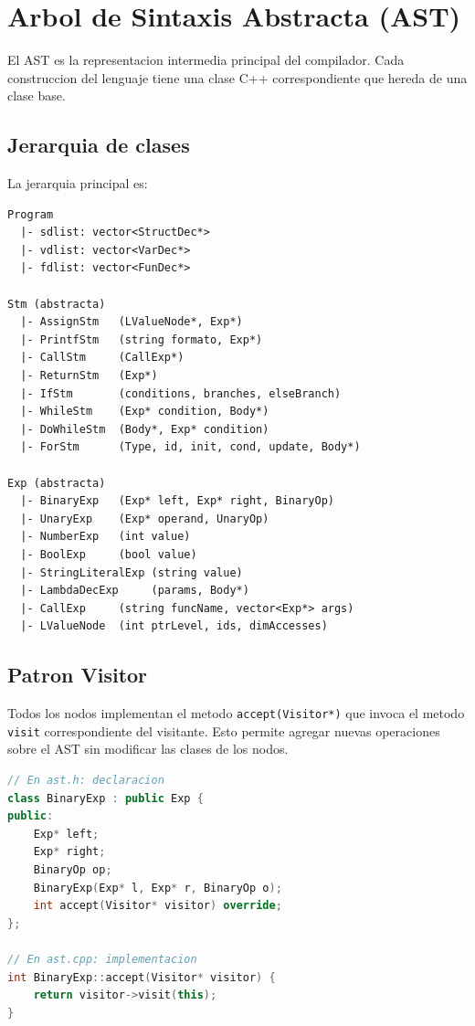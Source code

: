 \documentclass[12pt, a4paper]{article}
\begin{document}
\newpage

\section{Arbol de Sintaxis Abstracta (AST)}

El AST es la representacion intermedia principal del compilador. Cada construccion del lenguaje tiene una clase C++ correspondiente que hereda de una clase base.

\subsection{Jerarquia de clases}

La jerarquia principal es:

\begin{lstlisting}[style=grammarstyle, caption={Jerarquia del AST}]
Program
  |- sdlist: vector<StructDec*>
  |- vdlist: vector<VarDec*>
  |- fdlist: vector<FunDec*>

Stm (abstracta)
  |- AssignStm   (LValueNode*, Exp*)
  |- PrintfStm   (string formato, Exp*)
  |- CallStm     (CallExp*)
  |- ReturnStm   (Exp*)
  |- IfStm       (conditions, branches, elseBranch)
  |- WhileStm    (Exp* condition, Body*)
  |- DoWhileStm  (Body*, Exp* condition)
  |- ForStm      (Type, id, init, cond, update, Body*)

Exp (abstracta)
  |- BinaryExp   (Exp* left, Exp* right, BinaryOp)
  |- UnaryExp    (Exp* operand, UnaryOp)
  |- NumberExp   (int value)
  |- BoolExp     (bool value)
  |- StringLiteralExp (string value)
  |- LambdaDecExp     (params, Body*)
  |- CallExp     (string funcName, vector<Exp*> args)
  |- LValueNode  (int ptrLevel, ids, dimAccesses)
\end{lstlisting}

\subsection{Patron Visitor}

Todos los nodos implementan el metodo \texttt{accept(Visitor*)} que invoca el metodo \texttt{visit} correspondiente del visitante. Esto permite agregar nuevas operaciones sobre el AST sin modificar las clases de los nodos.

\begin{lstlisting}[language=C++, style=cppstyle, caption={Implementacion del patron Visitor en BinaryExp}]
// En ast.h: declaracion
class BinaryExp : public Exp {
public:
    Exp* left;
    Exp* right;
    BinaryOp op;
    BinaryExp(Exp* l, Exp* r, BinaryOp o);
    int accept(Visitor* visitor) override;
};

// En ast.cpp: implementacion
int BinaryExp::accept(Visitor* visitor) {
    return visitor->visit(this);
}
\end{lstlisting}
\end{document}
